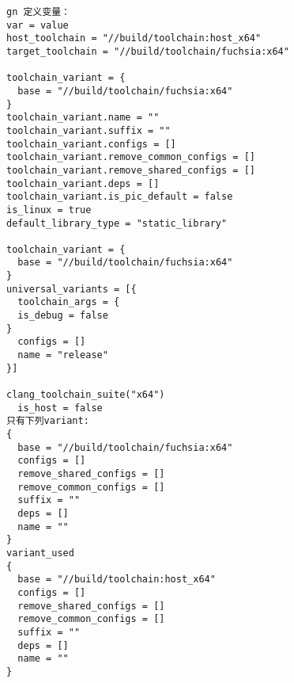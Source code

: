\begin{verbatim}
gn 定义变量：
var = value
host_toolchain = "//build/toolchain:host_x64"
target_toolchain = "//build/toolchain/fuchsia:x64"

toolchain_variant = {
  base = "//build/toolchain/fuchsia:x64"
}
toolchain_variant.name = ""
toolchain_variant.suffix = ""
toolchain_variant.configs = []
toolchain_variant.remove_common_configs = []
toolchain_variant.remove_shared_configs = []
toolchain_variant.deps = []
toolchain_variant.is_pic_default = false
is_linux = true
default_library_type = "static_library"

toolchain_variant = {
  base = "//build/toolchain/fuchsia:x64"
}
universal_variants = [{
  toolchain_args = {
  is_debug = false
}
  configs = []
  name = "release"
}]

clang_toolchain_suite("x64")
  is_host = false
只有下列variant:
{
  base = "//build/toolchain/fuchsia:x64"
  configs = []
  remove_shared_configs = []
  remove_common_configs = []
  suffix = ""
  deps = []
  name = ""
}
variant_used
{
  base = "//build/toolchain:host_x64"
  configs = []
  remove_shared_configs = []
  remove_common_configs = []
  suffix = ""
  deps = []
  name = ""
}

\end{verbatim}